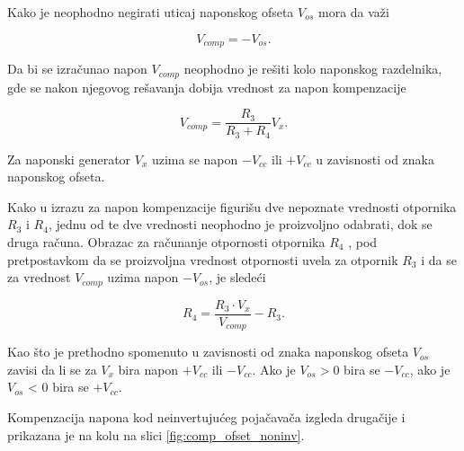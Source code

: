 {Kako je neophodno negirati uticaj naponskog ofseta $V_{os}$ mora da važi}

\begin{equation}
    V_{comp} = -V_{os}.
\end{equation}

{Da bi se izračunao napon $V_{comp}$ neophodno je rešiti kolo naponskog razdelnika, gde se nakon njegovog rešavanja dobija vrednost za napon kompenzacije}

\begin{equation}
    \boxed{V_{comp} = \frac{R_3}{R_3 + R_4} V_x}.
\end{equation}

{Za naponski generator $V_x$ uzima se napon $-V_{cc}$ ili $+V_{cc}$ u zavisnosti od znaka naponskog ofseta.}

{Kako u izrazu za napon kompenzacije figurišu dve nepoznate vrednosti otpornika $R_3$ i $R_4$, jednu od te dve vrednosti neophodno je proizvoljno odabrati, dok se druga računa. Obrazac za računanje otpornosti otpornika $R_4$ , pod pretpostavkom da se proizvoljna vrednost otpornosti uvela za otpornik $R_3$ i da se za vrednost $V_{comp}$ uzima napon $-V_{os}$, je sledeći}

\begin{equation}
    \boxed{R_4 = \frac{R_3 \cdot V_{x}}{V_{comp}} - R_3}.
\end{equation}

{Kao što je prethodno spomenuto u zavisnosti od znaka naponskog ofseta $V_{os}$ zavisi da li se za $V_x$ bira napon $+V_{cc}$ ili $-V_{cc}$. Ako je $V_{os} > 0$ bira se $-V_{cc}$, ako je $V_{os}$ < 0 bira se $+V_{cc}$.}

{Kompenzacija napona kod neinvertujućeg pojačavača izgleda drugačije i prikazana je na kolu na slici \ref{fig:comp_ofset_noninv}.}

